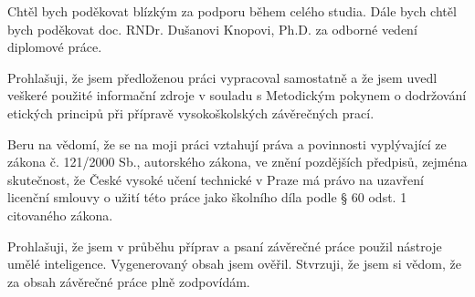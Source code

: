 \documentclass[czech,master,unicode,oneside]{ctufit-thesis}
\begin{document}
 
\frontmatter\frontmatterinit %

\thispagestyle{empty}\maketitle\thispagestyle{empty}\cleardoublepage %


\imprintpage %
\stopTOCentries

\begin{acknowledgmentpage}
    Chtěl bych poděkovat blízkým za podporu během celého studia.
    Dále bych chtěl bych poděkovat doc. RNDr. Dušanovi Knopovi, Ph.D. za odborné vedení diplomové práce.
\end{acknowledgmentpage}


\begin{declarationpage}
Prohlašuji, že jsem předloženou práci vypracoval samostatně a že jsem uvedl veškeré použité
informační zdroje v souladu s Metodickým pokynem o dodržování etických principů při přípravě
vysokoškolských závěrečných prací.

Beru na vědomí, že se na moji práci vztahují práva a povinnosti vyplývající ze zákona č. 121/2000 Sb.,
autorského zákona, ve znění pozdějších předpisů, zejména skutečnost, že České vysoké učení
technické v Praze má právo na uzavření licenční smlouvy o užití této práce jako školního díla podle §
60 odst. 1 citovaného zákona.

Prohlašuji, že jsem v průběhu příprav a psaní závěrečné práce použil nástroje umělé
inteligence. Vygenerovaný obsah jsem ověřil. Stvrzuji, že jsem si vědom, že za obsah
závěrečné práce plně zodpovídám.
\end{declarationpage}
\end{document}
